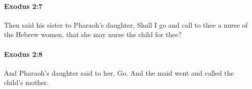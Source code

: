 		\paragraph{Exodus 2:7} %
			\label{EXODUS-2-7}

			Then said his sister to Pharaoh's daughter, Shall I go and call to thee a nurse of the Hebrew women, that she may nurse the child for thee?


		\paragraph{Exodus 2:8} %
			\label{EXODUS-2-8}

			And Pharaoh's daughter said to her, Go. And the maid went and called the child's mother.


